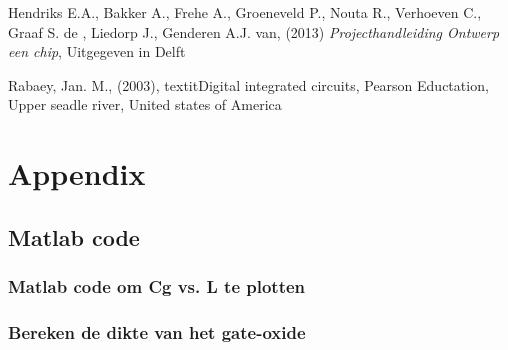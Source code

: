 \documentclass{report}
\begin{document}
\newpage
\begin{thebibliography}{7} %
%
Hendriks E.A., Bakker A., Frehe A., Groeneveld P., Nouta R., Verhoeven C., Graaf S. de , Liedorp J., Genderen A.J. van,  (2013) \textit{Projecthandleiding Ontwerp een chip}, Uitgegeven in Delft

Rabaey, Jan. M., (2003), textit{Digital integrated circuits}, Pearson Eductation, Upper seadle river, United states of America


\end{thebibliography}
\appendix
\chapter{Appendix}
\section{Matlab code}
\subsection{Matlab code om Cg vs. L te plotten}
\label{M1}

\subsection{Bereken de dikte van het gate-oxide}
\label{M2}
\end{document}
